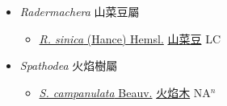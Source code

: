 
  \begin{itemize}
 \item[] \textit{Radermachera} 山菜豆屬
                    
  \begin{itemize}
        \item[] \href{http://www.theplantlist.org/tpl1.1/search?q=Radermachera+sinica}{\textit{R. sinica} (Hance) Hemsl.}   \href{\detokenize{http://taibnet.sinica.edu.tw/chi/taibnet_species_list.php?T2=山菜豆&T2_new_value=true&fr=y}}{山菜豆} LC
  \end{itemize}
 \item[] \textit{Spathodea} 火焰樹屬
                    
  \begin{itemize}
        \item[] \href{http://www.theplantlist.org/tpl1.1/search?q=Spathodea+campanulata}{\textit{S. campanulata} Beauv.}   \href{\detokenize{http://taibnet.sinica.edu.tw/chi/taibnet_species_list.php?T2=火焰木&T2_new_value=true&fr=y}}{火焰木} NA$^n$
  \end{itemize}
  \end{itemize}
